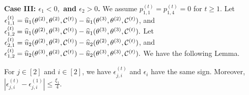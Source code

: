 \noindent \textbf{Case III: $\epsilon_1<0,$ and $\epsilon_2>0$.}
We assume $p^{(t)}_{1,1}=p^{(t)}_{1,4}=0$ for $t\geq1$. Let $\epsilon^{(t)}_{1,1} = \widehat{u}_1(\theta^{(2)},\theta^{(2)},\mathcal{C}^{(t)})-\widehat{u}_1(\theta^{(3)},\theta^{(2)},\mathcal{C}^{(t)})$, and $\epsilon^{(t)}_{1,2} = \widehat{u}_1(\theta^{(2)},\theta^{(3)},\mathcal{C}^{(t)})-\widehat{u}_1(\theta^{(3)},\theta^{(3)},\mathcal{C}^{(t)}).$ Let $\epsilon^{(t)}_{2,1} = \widehat{u}_2(\theta^{(2)},\theta^{(2)},\mathcal{C}^{(t)})-\widehat{u}_2(\theta^{(2)},\theta^{(3)},\mathcal{C}^{(t)})$, and $\epsilon^{(t)}_{1,2} = \widehat{u}_2(\theta^{(3)},\theta^{(2)},\mathcal{C}^{(t)})-\widehat{u}_2(\theta^{(3)},\theta^{(3)},\mathcal{C}^{(t)}).$ We have the following Lemma. 
\begin{lemma}
\label{lem:epsilon_ttt}
For $j\in[2]$ and $i\in[2]$, we have $\epsilon^{(t)}_{j,i}$ and $\epsilon_i$  have the same sign. Moreover, $|\epsilon_{j,i}^{(t)}-\epsilon_{j,i}^{(1)}|\leq\frac{\xi_1}{4}$. 
\end{lemma}
